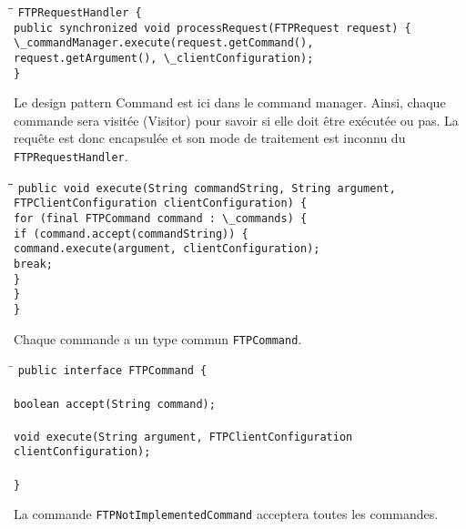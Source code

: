 \begin{tabbing}
\hspace{1cm}\=\hspace{1cm}\=\kill
\verb+FTPRequestHandler {+\\
	\>\verb+public synchronized void processRequest(FTPRequest request) {+\\
	\>\>\verb+\_commandManager.execute(request.getCommand(),+\\ 	\>\>\verb+request.getArgument(), \_clientConfiguration);+\\
\verb+}+
\end{tabbing}

Le design pattern Command est ici dans le command manager. Ainsi, chaque commande sera visitée (Visitor) pour savoir si elle doit être exécutée ou pas. La requête est donc encapsulée et son mode de traitement est inconnu du \verb+FTPRequestHandler+.

\begin{tabbing}
\hspace{1cm}\=\hspace{1cm}\=\hspace{1cm}\=\kill
\verb+public void execute(String commandString, String argument,+\\
\>\>\verb+FTPClientConfiguration clientConfiguration) {+\\
		\>\verb+for (final FTPCommand command : \_commands) {+\\
			\>\>\verb+if (command.accept(commandString)) {+\\
				\>\>\>\verb+command.execute(argument, clientConfiguration);+\\
				\>\>\>\verb+break;+\\
			\>\>\verb+}+\\
		\>\verb+}+\\
	\verb+}+\\
\end{tabbing}
Chaque commande a un type commun \verb+FTPCommand+.

\begin{tabbing}
\hspace{1cm}\=\kill
\verb+public interface FTPCommand {+\\
\\
    \>\verb+boolean accept(String command);+\\
\\
    \>\verb+void execute(String argument, FTPClientConfiguration clientConfiguration);+\\
\\
\verb+}+
\end{tabbing}
La commande \verb+FTPNotImplementedCommand+ acceptera toutes les commandes.

